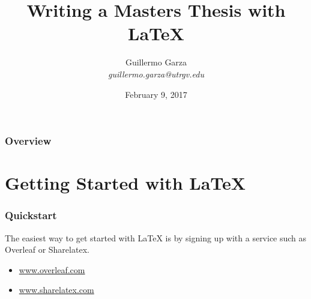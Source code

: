 \documentclass{beamer}
\title[Thesis with \LaTeX]{Writing a Masters Thesis with \LaTeX} %
\author{%
  Guillermo Garza\\[2pt]%
 \footnotesize\textit{guillermo.garza@utrgv.edu} %
}
\institute[UTRGV] %
{The University of Texas Rio Grande Valley}
\date{February 9, 2017} %
\begin{document}
\begin{frame}
  \titlepage
\end{frame}


\begin{frame}
\frametitle{Overview} %
\tableofcontents %
\end{frame}

\section{Getting Started with \LaTeX}

\begin{frame}
  \frametitle{Quickstart}

  The easiest way to get started with \LaTeX{} is by signing up with a service
  such as Overleaf or Sharelatex.

  \begin{itemize}
    \item \url{www.overleaf.com}
    \item \url{www.sharelatex.com}
  \end{itemize}

\end{frame}


\end{document}
